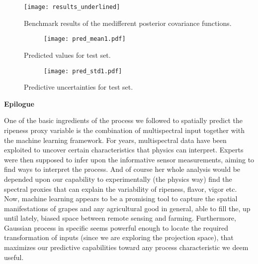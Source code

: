 \documentclass[12pt,a4paper,oneside]{book}
\theoremstyle{plain}
\theoremstyle{definition}
\begin{document}
{\begin{figure}[!ht]
\begin{flushleft}
\hspace*{-2cm}
\texttt{[image: results\_underlined]}
\caption{Benchmark results of the medifferent posterior covariance functions.}
\end{flushleft}
\end{figure}

\newpage
\begin{figure}[!ht]
\begin{subfigure}[b]{0.4\textwidth}
\begin{center}
\texttt{[image: pred\_mean1.pdf]}
\end{center}
\end{subfigure}
\caption{Predicted values for test set.}

\begin{subfigure}[b]{0.5\textwidth}
\begin{center}
\texttt{[image: pred\_std1.pdf]}

\end{center}
\end{subfigure}
\caption{Predictive uncertainties for test set.}
\end{figure}
\newpage

\begin{flushleft}
\begin{Huge}
\textbf{Epilogue}
\end{Huge}
\end{flushleft}
One of the basic ingredients of the process we followed to spatially predict the ripeness proxy variable is the combination of multispectral input together with the machine learning framework. For years, multispectral data have been exploited to uncover certain characteristics that physics can interpret. Experts were then supposed to infer upon the informative sensor measurements, aiming to find ways to interpret the process. And of course her whole analysis would be depended upon our capability to experimentally (the physics way) find the spectral proxies that can explain the variability of ripeness, flavor, vigor etc. Now, machine learning appears to be a promising tool to capture the spatial manifestations of grapes and any agricultural good in general, able to fill the, up until lately, biased space between remote sensing and farming. Furthermore, Gaussian process in specific seems powerful enough to locate the required transformation of inputs (since we are exploring the projection space), that maximizes our predictive capabilities toward any process characteristic we deem useful.


}
\end{document}

